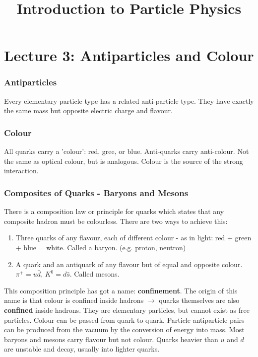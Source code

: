 \documentclass[10pt,a4paper]{article}
\title{Introduction to Particle Physics}
\begin{document}
\part*{Lecture 3: Antiparticles and Colour}

\section*{Antiparticles}

Every elementary particle type has a related anti-particle type. They have exactly the same mass but opposite electric charge and flavour.

\section*{Colour}

All quarks carry a 'colour': red, gree, or blue. Anti-quarks carry anti-colour. Not the same as optical colour, but is analogous. Colour is the source of the strong interaction.

\section*{Composites of Quarks - Baryons and Mesons}

There is a composition law or principle for quarks which states that any composite hadron must be colourless. There are two ways to achieve this:

\begin{enumerate}
\item Three quarks of any flavour, each of different colour - as in light: red + green + blue = white. Called a baryon. (e.g. proton, neutron)
\item A quark and an antiquark of any flavour but of equal and opposite colour. $\pi^+ = u\bar{d}$, $K^0 = d\bar{s}$. Called mesons.
\end{enumerate}

This composition principle has got a name: \textbf{confinement}. The origin of this name is that colour is confined inside hadrons $\rightarrow$ quarks themselves are also \textbf{confined} inside hadrons. They are elementary particles, but cannot exist as free particles. Colour can be passed from quark to quark. Particle-antiparticle pairs can be produced from the vacuum by the conversion of energy into mass. Most baryons and mesons carry flavour but not colour. Quarks heavier than $u$ and $d$ are unstable and decay, usually into lighter quarks.
\end{document}
